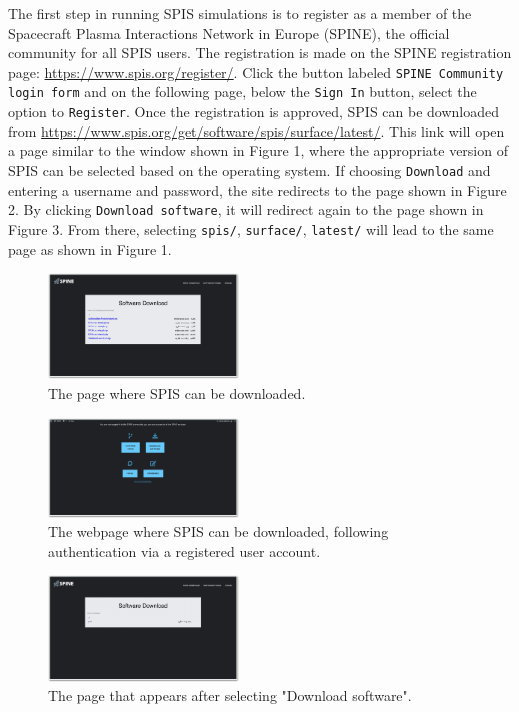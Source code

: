 \documentclass[a4paper, 11pt]{article}
\begin{document}
The first step in running SPIS simulations is to register as a member of the  Spacecraft Plasma Interactions Network in Europe (SPINE), the official community for all SPIS users. The registration is made on the SPINE registration page: \url{https://www.spis.org/register/}. Click the button labeled \verb|SPINE Community login form| and on the following page, below the \verb|Sign In| button, select the option to \verb|Register|. Once the registration is approved, SPIS can be downloaded from \url{https://www.spis.org/get/software/spis/surface/latest/}. This link will open a page similar to the window shown in Figure 1, where the appropriate version of SPIS can be selected based on the operating system. If choosing \verb|Download| and entering a username and password, the site redirects to the page shown in Figure 2. By clicking \verb|Download software|, it will redirect again to the page shown in Figure 3. From there, selecting \verb|spis/|, \verb|surface/|, \verb|latest/| will lead to the same page as shown in Figure 1.

\begin{figure}[!ht]
    \centering
    \includegraphics[width=0.45\textwidth]{fig1.jpg}
    \caption{The page where SPIS can be downloaded.}
\end{figure}

\begin{figure}[!ht]
    \centering
    \includegraphics[width=0.45\textwidth]{fig2.jpg}
    \caption{The webpage where SPIS can be downloaded, following authentication via a registered user account.}
\end{figure}

\begin{figure}[!ht]
    \centering
    \includegraphics[width=0.45\textwidth]{fig3.jpg}
    \caption{The page that appears after selecting "Download software".}
\end{figure}
\end{document}
